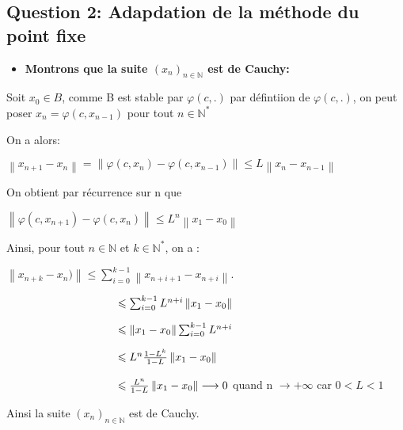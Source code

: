 \documentclass[11pt]{article}
\providecommand{\tightlist}{%
      \setlength{\itemsep}{0pt}\setlength{\parskip}{0pt}}
\begin{document}
    \hypertarget{question-2-adapdation-de-la-muxe9thode-du-point-fixe}{%
\subsection{\texorpdfstring{\textbf{Question 2: Adapdation de la méthode
du point
fixe}}{Question 2: Adapdation de la méthode du point fixe}}\label{question-2-adapdation-de-la-muxe9thode-du-point-fixe}}

    \begin{itemize}
\tightlist
\item
  \textbf{Montrons que la suite \((x_n)_{n\in \mathbb{N}}\) est de
  Cauchy:}
\end{itemize}

Soit \(x_0 \in B\), comme B est stable par \(\varphi(c,.)\) par
défintiion de \(\varphi(c,.)\), on peut poser
\(x_n = \varphi(c,x_{n-1})\) pour tout \(n \in \mathbb{N}^*\)

On a alors:

\(\left\lVert x_{n+1}-x_n \right\rVert = \left\lVert \varphi(c,x_n) -\varphi(c,x_{n-1})\right\rVert \leqslant L\left\lVert x_n-x_{n-1}\right\rVert\)

On obtient par récurrence sur n que

\(\left\lVert \varphi(c,x_{n+1}) -\varphi(c,x_{n})\right\rVert \leqslant L^n \left\lVert x_1-x_{0}\right\rVert\)

Ainsi, pour tout \(n\in \mathbb{N}\) et \(k \in \mathbb{N}^*\), on a :

\(\left\lVert x_{n+k} -x_{n})\right\rVert \leqslant \sum_{i=0}^{k-1} \left\lVert x_{n+i+1}-x_{n+i}\right\rVert\).

\(\hspace{100px}\leqslant \sum_{i=0}^{k-1} L^{n+i}\left\lVert x_{1}-x_{0}\right\rVert\)

\(\hspace{100px}\leqslant \left\lVert x_{1}-x_{0}\right\rVert \sum_{i=0}^{k-1} L^{n+i}\)

\(\hspace{100px}\leqslant L^n\frac{1-L^k}{1-L}\left\lVert x_{1}-x_{0}\right\rVert \hspace{10px}\)

\(\hspace{100px}\leqslant \frac{L^n}{1-L}\left\lVert x_{1}-x_{0}\right\rVert \longrightarrow 0\)
quand n \(\longrightarrow +\infty\) car \(0<L<1\)

Ainsi la suite \((x_n)_{n \in \mathbb{N}}\) est de Cauchy.
\end{document}
